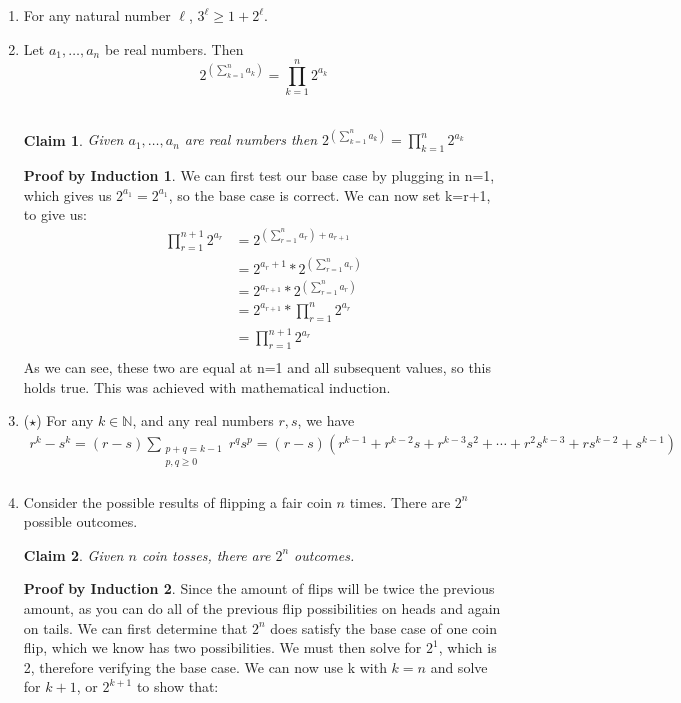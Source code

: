 \documentclass[11pt]{letter}
\newtheorem{claim}{Claim}
\theoremstyle{definition}
\newtheorem{PBI}{Proof by Induction}
\begin{document}
\begin{description}
\begin{enumerate}
			\item For any natural number $\ell$, $3^\ell\geq 1+2^\ell$.
			\item Let $a_1,\ldots, a_n$ be real numbers. Then
				$$2^{\left(\sum_{k=1}^n a_k\right)}=\prod_{k=1}^n 2^{a_k}$$ \\
\begin{claim}
Given $a_1,\ldots, a_n$ are real numbers then $2^{\left(\sum_{k=1}^n a_k\right)}=\prod_{k=1}^n 2^{a_k}$ \\
\end{claim}
\begin{PBI}
We can first test our base case by plugging in n=1, which gives us $2^{a_1}=2^{a_1}$, so the base case is correct. We can now set k=r+1, to give us: \\
\begin{align*}
\prod_{r=1}^{n+1} 2^{a_r}&=2^{\left(\sum_{r=1}^n a_{r}\right) +a_{r+1}} \tag{replaces k with r+1} \\
&=2^{a_r+1}*2^{\left(\sum_{r=1}^n a_{r}\right)} \\
&=2^{a_{r+1}}*2^{\left(\sum_{r=1}^n a_{r}\right)} \tag{Substituted using inductive assumption}\\
&=2^{a_{r+1}}*\prod_{r=1}^n 2^{a_r} \\
&=\prod_{r=1}^{n+1} 2^{a_r} \\
\end{align*}
As we can see, these two are equal at n=1 and all subsequent values, so this holds true. This was achieved with mathematical induction. \\
\end{PBI}
			\item ($\star$) For any $k\in\mathbb{N}$, and any real numbers $r,s$, we have 
				\begin{align*}
					r^k-s^k=(r-s)\sum_{\substack{p+q=k-1\\p,q\geq 0}} r^qs^p=(r-s)\left(r^{k-1}+r^{k-2}s+r^{k-3}s^2+\cdots+r^2s^{k-3}+rs^{k-2}+s^{k-1}\right) \\
				\end{align*}
			\item Consider the possible results of flipping a fair coin $n$ times. There are $2^n$ possible outcomes. 
\begin{claim}
Given $n$ coin tosses, there are $2^n$ outcomes.
\end{claim}
\begin{PBI}
Since the amount of flips will be twice the previous amount, as you can do all of the previous flip possibilities on heads and again on tails. We can first determine that $2^n$ does satisfy the base case of one coin flip, which we know has two possibilities. We must then solve for $2^1$, which is 2, therefore verifying the base case. We can now use k with $k=n$ and solve for $k+1$, or $2^{k+1}$ to show that:\\

\end{PBI}
\end{enumerate}
\end{description}
\end{document}
